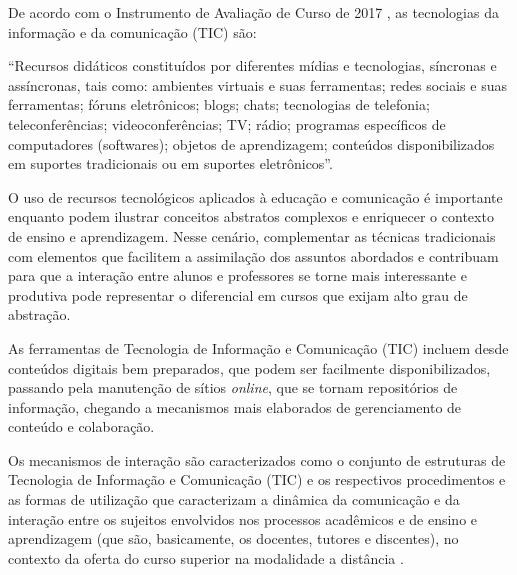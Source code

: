 
De acordo com o Instrumento de Avaliação de Curso de 2017 \cite{instrumento2017}, as tecnologias da informação e da comunicação (TIC) são: 

\begin{citacao}
    ``Recursos didáticos constituídos por diferentes mídias e tecnologias, síncronas e assíncronas, tais como: ambientes virtuais e suas ferramentas; redes sociais e suas ferramentas; fóruns eletrônicos; blogs; chats; tecnologias de telefonia; teleconferências; videoconferências; TV; rádio; programas específicos de computadores (softwares); objetos de aprendizagem;   conteúdos disponibilizados em suportes tradicionais ou em suportes eletrônicos''.
\end{citacao}

O uso de recursos tecnológicos aplicados à educação e comunicação é importante enquanto podem ilustrar conceitos abstratos complexos e enriquecer o contexto de ensino e aprendizagem. Nesse cenário, complementar as técnicas tradicionais com elementos que facilitem a assimilação dos assuntos abordados e contribuam para que a interação entre alunos e professores se torne mais interessante e produtiva pode representar o diferencial em cursos que exijam alto grau de abstração.

As ferramentas de Tecnologia de Informação e Comunicação (TIC) incluem desde conteúdos digitais bem preparados, que podem ser facilmente disponibilizados, passando pela manutenção de sítios \textit{online}, que se tornam repositórios de informação, chegando a mecanismos mais elaborados de gerenciamento de conteúdo e colaboração.

Os mecanismos de interação são caracterizados como o conjunto de estruturas de Tecnologia de Informação e Comunicação (TIC) e os respectivos procedimentos e as formas de utilização que caracterizam a dinâmica da comunicação e da interação entre os sujeitos envolvidos nos processos acadêmicos e de ensino e aprendizagem (que são, basicamente, os docentes, tutores e discentes), no contexto da oferta do curso superior na modalidade a distância \cite{instrumento2017}.

